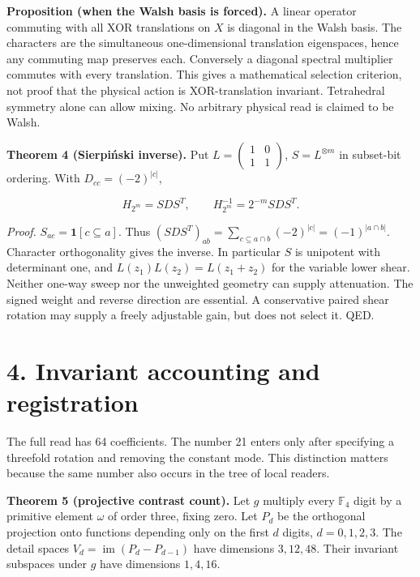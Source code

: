 \documentclass[
  11pt,
]{article}
\begin{document}
\textbf{Proposition (when the Walsh basis is forced).} A linear operator
commuting with all XOR translations on \(X\) is diagonal in the Walsh
basis. The characters are the simultaneous one-dimensional translation
eigenspaces, hence any commuting map preserves each. Conversely a
diagonal spectral multiplier commutes with every translation. This gives
a mathematical selection criterion, not proof that the physical action
is XOR-translation invariant. Tetrahedral symmetry alone can allow
mixing. No arbitrary physical read is claimed to be Walsh.

\textbf{Theorem 4 (Sierpiński inverse).} Put
\(L=\begin{pmatrix}1&0\\1&1\end{pmatrix}\), \(S=L^{\otimes m}\) in
subset-bit ordering. With \(D_{cc}=(-2)^{|c|}\),

\[H_{2^m}=SDS^T,\qquad H_{2^m}^{-1}=2^{-m}SDS^T.\]

\emph{Proof.} \(S_{ac}=\mathbf1[c\subseteq a]\). Thus
\((SDS^T)_{ab}=\sum_{c\subseteq a\cap b}(-2)^{|c|}=(-1)^{|a\cap b|}\).
Character orthogonality gives the inverse. In particular \(S\) is
unipotent with determinant one, and \(L(z_1)L(z_2)=L(z_1+z_2)\) for the
variable lower shear. Neither one-way sweep nor the unweighted geometry
can supply attenuation. The signed weight and reverse direction are
essential. A conservative paired shear rotation may supply a freely
adjustable gain, but does not select it. QED.

\section{4. Invariant accounting and
registration}\label{invariant-accounting-and-registration}

The full read has 64 coefficients. The number 21 enters only after
specifying a threefold rotation and removing the constant mode. This
distinction matters because the same number also occurs in the tree of
local readers.

\textbf{Theorem 5 (projective contrast count).} Let \(g\) multiply every
\(\mathbb F_4\) digit by a primitive element \(\omega\) of order three,
fixing zero. Let \(P_d\) be the orthogonal projection onto functions
depending only on the first \(d\) digits, \(d=0,1,2,3\). The detail
spaces \(V_d=\operatorname{im}(P_d-P_{d-1})\) have dimensions
\(3,12,48\). Their invariant subspaces under \(g\) have dimensions
\(1,4,16\).
\end{document}
